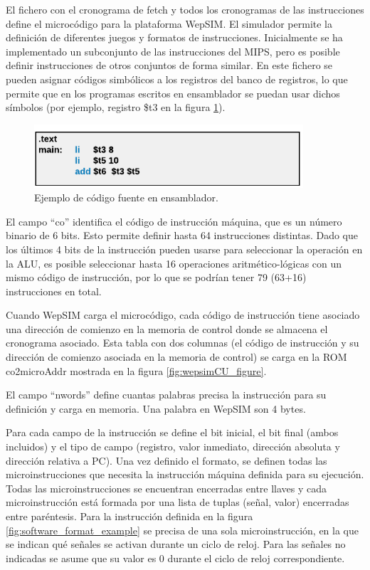 \vspace{10mm}

El fichero con el cronograma de fetch y todos los cronogramas de las instrucciones define el microcódigo para la plataforma WepSIM. El simulador permite la definición de diferentes juegos y formatos de instrucciones. Inicialmente se ha implementado un subconjunto de las instrucciones del MIPS, pero es posible definir instrucciones de otros conjuntos de forma similar. En este fichero se pueden asignar códigos simbólicos a los registros del banco de registros, lo que permite que en los programas escritos en ensamblador se puedan usar dichos  símbolos (por ejemplo, registro \$t3 en la figura \ref{fig:software_assembly_example}).

\begin{figure}[htbp]
 	\centering
 	\includegraphics[width=10cm]{figures/example_assembly}
 	\caption{Ejemplo de código fuente en ensamblador.}
	\label{fig:software_assembly_example}
\end{figure}

El campo “co” identifica el código de instrucción máquina, que es un número binario de 6 bits. Esto permite definir hasta 64 instrucciones distintas. Dado que los últimos 4 bits de la instrucción pueden usarse para seleccionar la operación en la ALU, es posible seleccionar hasta 16 operaciones aritmético-lógicas con un mismo código de instrucción, por lo que se podrían tener 79 (63+16) instrucciones en total.

Cuando WepSIM carga el microcódigo, cada código de instrucción tiene asociado una dirección de comienzo en la memoria de control donde se almacena el cronograma asociado. Esta tabla con dos columnas (el código de instrucción y su dirección de comienzo asociada en la memoria de control) se carga en la ROM co2microAddr mostrada en la figura \ref{fig:wepsimCU_figure}.

El campo ``nwords'' define cuantas palabras precisa la instrucción para su definición y carga en memoria. Una palabra en WepSIM son 4 bytes.

Para cada campo de la instrucción se define el bit inicial, el bit final (ambos incluidos) y el tipo de campo (registro, valor inmediato, dirección absoluta y dirección relativa a PC). Una vez definido el formato, se definen todas las microinstrucciones que necesita la instrucción máquina definida para su ejecución. Todas las microinstrucciones se encuentran encerradas entre llaves y cada microinstrucción está formada por una lista de tuplas (señal, valor) encerradas entre paréntesis. Para la instrucción definida en la figura \ref{fig:software_format_example} se precisa de una sola microinstrucción, en la que se indican qué señales se activan durante un ciclo de reloj. Para las señales no indicadas se asume que su valor es 0 durante el ciclo de reloj correspondiente.

